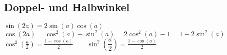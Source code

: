 \subsection{Doppel- und Halbwinkel}	
	$\sin(2a)=2\sin(a)\cos(a)$\\
	$\cos(2a)=\cos^2(a)-\sin^2(a)=2\cos^2(a)-1=1-2\sin^2(a)$\\
	$\cos^2 \left(\frac{a}{2}\right)=\frac{1+\cos(a)}{2} \qquad
	\sin^2 \left(\dfrac{a}{2}\right)=\frac{1-\cos(a)}{2}$